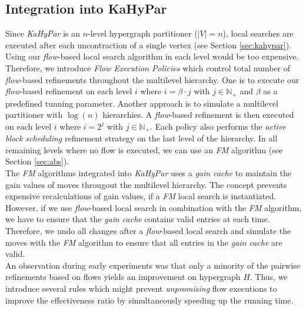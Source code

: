 \subsection{Integration into KaHyPar}
\label{sec:integration_kahypar}

Since \emph{KaHyPar} is an $n$-level hypergraph partitioner ($|V| = n$), local searches
are executed after each uncontraction of a single vertex (see Section \ref{sec:kahypar}). 
Using our \emph{flow}-based local search algorithm in each level would be too expensive.
Therefore, we introduce \emph{Flow Execution Policies} which control total number of
\emph{flow}-based refinements throughout the multilevel hierarchy. One is to execute our \emph{flow}-based
refinement on each level $i$ where $i = \beta\cdot j$ with $j \in \mathbb{N}_+$ and
$\beta$ as a predefined tunning parameter. Another approach is to simulate a
multilevel partitioner with $\log(n)$ hierarchies. A \emph{flow}-based refinement is then
executed on each level $i$ where $i = 2^j$ with $j \in \mathbb{N}_+$. Each policy also
performs the \emph{active block scheduling} refinement strategy on the last level of the
hierarchy. In all remaining levels where no flow is executed, we can use an 
\emph{FM} algorithm 
\cite{akhremtsev2017engineering,fiduccia1988linear,sanchis1989multiple} (see Section 
\ref{sec:abs}). \\
The \emph{FM} algorithms integrated into \emph{KaHyPar} uses a \emph{gain cache} to maintain
the gain values of moves througout the multilevel hierarchy. The concept prevents expensive recalculations
of gain values, if a \emph{FM} local search is instantiated. However, if we use \emph{flow}-based
local search in combination with the \emph{FM} algorithm, we have to ensure that the 
\emph{gain cache} contains valid entries at each time. Therefore, we undo all changes after a \emph{flow}-based
local search and simulate the moves with the \emph{FM} algorithm to ensure that all entries in
the \emph{gain cache} are valid.\\
An observation during early experiments was that only a minority
of the pairwise refinements based on flows yields an improvement
on hypergraph $H$. Thus, we introduce several rules which might prevent
\emph{unpromising} flow executions to improve the effectiveness ratio by simultaneously speeding up
the running time.

